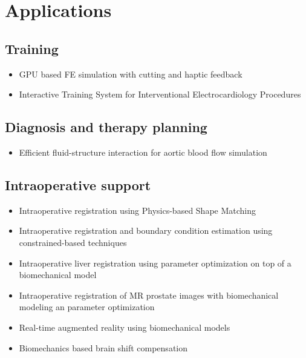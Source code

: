 \part{Applications}


\label{Applications}

\chapter{Training}
\begin{itemize}
	\item GPU based FE simulation with cutting and haptic feedback \cite{Courtecuisse2010a}
	\item Interactive Training System for Interventional Electrocardiology Procedures \cite{Talbot2014}
\end{itemize}

\chapter{Diagnosis and therapy planning}
\begin{itemize}
	\item Efficient fluid-structure interaction for aortic blood flow simulation \cite{Sturla2013}
	
\end{itemize}

\chapter{Intraoperative support}
\begin{itemize}
  \item Intraoperative registration using Physics-based Shape Matching \cite{Suwelack2014}	
	\item Intraoperative registration and boundary condition estimation using constrained-based techniques\cite{Peterlik2014}
	\item Intraoperative liver registration using parameter optimization on top of a biomechanical model\cite{Rucker2013}
	\item Intraoperative registration of MR prostate images with biomechanical modeling an parameter optimization \cite{Alterovitz2006}
	\item Real-time augmented reality using biomechanical models\cite{Haouchine2013a}
	\item Biomechanics based brain shift compensation\cite{Clatz2005}
	
\end{itemize}


